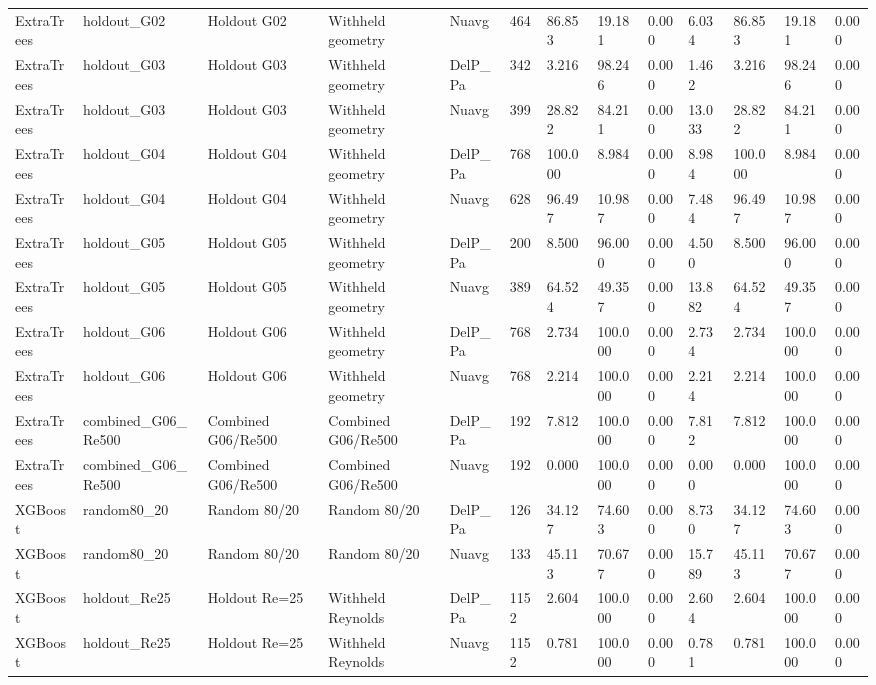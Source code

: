 \begin{tabular}{lllllllllllll}
ExtraTrees & holdout_G02 & Holdout G02 & Withheld geometry & Nuavg & 464 & 86.853 & 19.181 & 0.000 & 6.034 & 86.853 & 19.181 & 0.000 \\
ExtraTrees & holdout_G03 & Holdout G03 & Withheld geometry & DelP_Pa & 342 & 3.216 & 98.246 & 0.000 & 1.462 & 3.216 & 98.246 & 0.000 \\
ExtraTrees & holdout_G03 & Holdout G03 & Withheld geometry & Nuavg & 399 & 28.822 & 84.211 & 0.000 & 13.033 & 28.822 & 84.211 & 0.000 \\
ExtraTrees & holdout_G04 & Holdout G04 & Withheld geometry & DelP_Pa & 768 & 100.000 & 8.984 & 0.000 & 8.984 & 100.000 & 8.984 & 0.000 \\
ExtraTrees & holdout_G04 & Holdout G04 & Withheld geometry & Nuavg & 628 & 96.497 & 10.987 & 0.000 & 7.484 & 96.497 & 10.987 & 0.000 \\
ExtraTrees & holdout_G05 & Holdout G05 & Withheld geometry & DelP_Pa & 200 & 8.500 & 96.000 & 0.000 & 4.500 & 8.500 & 96.000 & 0.000 \\
ExtraTrees & holdout_G05 & Holdout G05 & Withheld geometry & Nuavg & 389 & 64.524 & 49.357 & 0.000 & 13.882 & 64.524 & 49.357 & 0.000 \\
ExtraTrees & holdout_G06 & Holdout G06 & Withheld geometry & DelP_Pa & 768 & 2.734 & 100.000 & 0.000 & 2.734 & 2.734 & 100.000 & 0.000 \\
ExtraTrees & holdout_G06 & Holdout G06 & Withheld geometry & Nuavg & 768 & 2.214 & 100.000 & 0.000 & 2.214 & 2.214 & 100.000 & 0.000 \\
ExtraTrees & combined_G06_Re500 & Combined G06/Re500 & Combined G06/Re500 & DelP_Pa & 192 & 7.812 & 100.000 & 0.000 & 7.812 & 7.812 & 100.000 & 0.000 \\
ExtraTrees & combined_G06_Re500 & Combined G06/Re500 & Combined G06/Re500 & Nuavg & 192 & 0.000 & 100.000 & 0.000 & 0.000 & 0.000 & 100.000 & 0.000 \\
XGBoost & random80_20 & Random 80/20 & Random 80/20 & DelP_Pa & 126 & 34.127 & 74.603 & 0.000 & 8.730 & 34.127 & 74.603 & 0.000 \\
XGBoost & random80_20 & Random 80/20 & Random 80/20 & Nuavg & 133 & 45.113 & 70.677 & 0.000 & 15.789 & 45.113 & 70.677 & 0.000 \\
XGBoost & holdout_Re25 & Holdout Re=25 & Withheld Reynolds & DelP_Pa & 1152 & 2.604 & 100.000 & 0.000 & 2.604 & 2.604 & 100.000 & 0.000 \\
XGBoost & holdout_Re25 & Holdout Re=25 & Withheld Reynolds & Nuavg & 1152 & 0.781 & 100.000 & 0.000 & 0.781 & 0.781 & 100.000 & 0.000 \\

\end{tabular}
